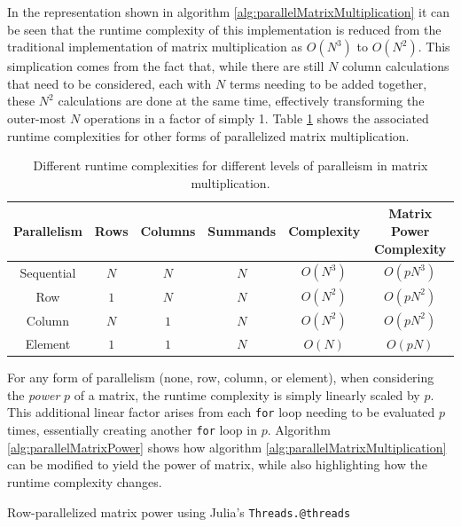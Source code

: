 \documentclass{article}
\begin{document}
    In the representation shown in algorithm \ref{alg:parallelMatrixMultiplication} it can be seen that the runtime complexity of this implementation is reduced from the traditional implementation of matrix multiplication as $O(N^3)$ to $O(N^2)$.  This simplication comes from the fact that, while there are still $N$ column calculations that need to be considered, each with $N$ terms needing to be added together, these $N^2$ calculations are done at the same time, effectively transforming the outer-most $N$ operations in a factor of simply 1. Table \ref{tbl:runtimeComplexity} shows the associated runtime complexities for other forms of parallelized matrix multiplication.
    
    \begin{table}[h]
        \centering
        \begin{tabular}{|c||c|c|c|c|c|}
            \hline
            Parallelism & Rows & Columns & Summands & Complexity & Matrix Power Complexity \\
            \hline
            \hline
            Sequential & $N$  & $N$     & $N$      & $O(N^3)$    & $O(p N^3)$   \\
            \hline
            Row    & $1$  & $N$     & $N$      & $O(N^2)$        & $O(p N^2)$   \\
            \hline
            Column & $N$  & $1$     & $N$      & $O(N^2)$        & $O(p N^2)$   \\
            \hline
            Element & $1$  & $1$    & $N$      & $O(N)$          & $O(p N)$   \\
            \hline
        \end{tabular}
        \caption{Different runtime complexities for different levels of paralleism in matrix multiplication.}
        \label{tbl:runtimeComplexity}
    \end{table}

    For any form of parallelism (none, row, column, or element), when considering the \emph{power} $p$ of a matrix, the runtime complexity is simply linearly scaled by $p$.  This additional linear factor arises from each \verb|for| loop needing to be evaluated $p$ times, essentially creating another \verb|for| loop in $p$.  Algorithm \ref{alg:parallelMatrixPower} shows how algorithm \ref{alg:parallelMatrixMultiplication} can be modified to yield the power of matrix, while also highlighting how the runtime complexity changes.

    \begin{algorithm}[h]
        \caption{Row-parallelized matrix power using Julia's \texttt{Threads.@threads}}
        \label{alg:parallelMatrixPower}
    \end{algorithm}
\end{document}
